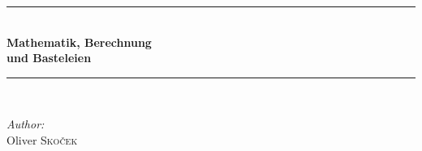 \documentclass[11pt,a4paper,leqno]{report}
\numberwithin{equation}{chapter}
\renewcommand{\contentsname}{Inhaltsverzeichnis}
\begin{document}
\begin{titlepage}

\vspace*{5cm}
\begin{center}
\rule{\linewidth}{0.5mm} \\[0.4cm]
{ \Huge \bfseries Mathematik, Berechnung} \\[0.2cm]
{ \Huge \bfseries und Basteleien}\\[0.2cm]
\rule{\linewidth}{0.5mm} \\[3.5cm]
\begin{minipage}[t]{0.4\textwidth}
\begin{flushleft} \large
\emph{Author:}\\
Oliver \textsc{Sko\v{c}ek} \\[4cm]
\small

\end{flushleft}

\end{minipage}
\begin{minipage}[t]{0.4\textwidth}

\end{minipage}
 

 
\end{center}
 
\end{titlepage}




\tableofcontents


\vfill
\end{document}
